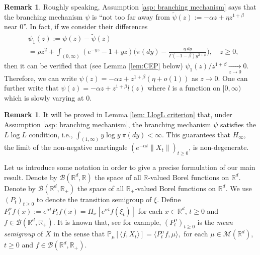 \documentclass[12pt,a4paper]{amsart}
\theoremstyle{plain}
\theoremstyle{definition}
\newtheorem{rem}[thm]{Remark}
\numberwithin{equation}{section}
\begin{document}
\begin{rem}
  \label{rem:SP}
Roughly speaking, Assumption \ref{asp: branching mechanism} says that the branching mechanism $\psi$ is ``not too far away from $\widetilde \psi(z) := - \alpha z + \eta z^{1+\beta}$ near $0$''.
In fact, if we consider their differences
\begin{align}
  \label{eq:PB}
  & \psi_1(z)
  := \psi(z) - \widetilde \psi(z)
  \\ &= \rho z^2+ \int_{(0,\infty)}(e^{-yz}-1+yz) \Big(\pi(dy) - \frac{\eta~dy}{\Gamma(-1-\beta) y^{2+\beta}}\Big),
  \quad z\geq 0,
\end{align}
then it can be verified that (see Lemma \ref{lem:CEP} below) $\psi_1(z)/z^{1+\beta} \xrightarrow[z\to 0]{} 0$.
Therefore, we can write $ \psi(z)  = - \alpha z + z^{1+\beta}(\eta + o(1))$ as $z\to 0$.
One can further write that $\psi(z) = - \alpha z + z^{1+\beta} l(z)$ where $l$ is a function on $[0,\infty)$ which is slowly varying at $0$.
\end{rem}

\begin{rem}
It will be proved in Lemma \ref{lem: LlogL criterion} that, under Assumption \ref{asp: branching mechanism}, the branching mechanism $\psi$ satisfies the $L \log L$ condition, i.e., $ \int_{(1,\infty)} y\log y~\pi(dy) < \infty. $
This guarantees that $H_\infty$, the limit of the non-negative martingale $(e^{-\alpha t} \|X_t\|)_{t\geq 0}$, is non-degenerate.
\end{rem}
Let us introduce some notation in order to give a precise formulation of our main result.
Denote by $\mathcal B(\mathbb R^d, \mathbb R)$ the space of all $\mathbb R$-valued Borel functions on $\mathbb R^d$.
Denote by $\mathcal B(\mathbb R^d, \mathbb R_+)$ the space of all $\mathbb R_+$-valued Borel functions on $\mathbb R^d$.
We use  $(P_t)_{t\geq 0}$ to denote the transition semigroup of $\xi$.	
Define
\(  
P^{\alpha}_t f(x)
  := e^{\alpha t} P_t f(x)
  = \Pi_x [e^{\alpha t}f(\xi_t)]
\)
for each $x\in \mathbb R^d$, $t\geq 0$ and $f\in \mathcal B(\mathbb R^d, \mathbb R_+)$.
It is known that, see \cite[Proposition 2.27]{Li2011Measure-valued} for example, $(P^\alpha_t)_{t\geq 0}$ is the \emph{mean semigroup} of $X$ in the sense that
\( 
  \mathbb{P}_{\mu}[\langle f, X_t \rangle]
  = \langle P^\alpha_t f, \mu \rangle,
\)
for each $\mu\in \mathcal M(\mathbb R^d)$, $t\geq 0$ and $f\in \mathcal B(\mathbb R^d, \mathbb R_+)$.
\end{document}
